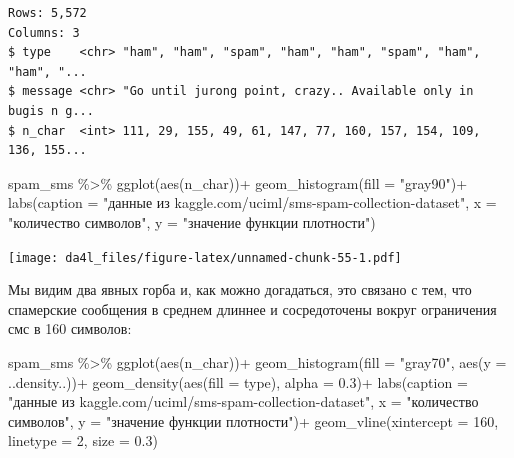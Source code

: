 \documentclass[
]{book}
\newenvironment{Shaded}{\begin{snugshade}}{\end{snugshade}}
\newcommand{\AttributeTok}[1]{\textcolor[rgb]{0.77,0.63,0.00}{#1}}
\newcommand{\DecValTok}[1]{\textcolor[rgb]{0.00,0.00,0.81}{#1}}
\newcommand{\FloatTok}[1]{\textcolor[rgb]{0.00,0.00,0.81}{#1}}
\newcommand{\FunctionTok}[1]{\textcolor[rgb]{0.00,0.00,0.00}{#1}}
\newcommand{\NormalTok}[1]{#1}
\newcommand{\SpecialCharTok}[1]{\textcolor[rgb]{0.00,0.00,0.00}{#1}}
\newcommand{\StringTok}[1]{\textcolor[rgb]{0.31,0.60,0.02}{#1}}
\begin{document}
\begin{verbatim}
Rows: 5,572
Columns: 3
$ type    <chr> "ham", "ham", "spam", "ham", "ham", "spam", "ham", "ham", "...
$ message <chr> "Go until jurong point, crazy.. Available only in bugis n g...
$ n_char  <int> 111, 29, 155, 49, 61, 147, 77, 160, 157, 154, 109, 136, 155...
\end{verbatim}

\begin{Shaded}
\begin{Highlighting}[]
\NormalTok{spam\_sms }\SpecialCharTok{\%\textgreater{}\%} 
  \FunctionTok{ggplot}\NormalTok{(}\FunctionTok{aes}\NormalTok{(n\_char))}\SpecialCharTok{+}
  \FunctionTok{geom\_histogram}\NormalTok{(}\AttributeTok{fill =} \StringTok{"gray90"}\NormalTok{)}\SpecialCharTok{+}
  \FunctionTok{labs}\NormalTok{(}\AttributeTok{caption =} \StringTok{"данные из kaggle.com/uciml/sms{-}spam{-}collection{-}dataset"}\NormalTok{,}
       \AttributeTok{x =} \StringTok{"количество символов"}\NormalTok{,}
       \AttributeTok{y =} \StringTok{"значение функции плотности"}\NormalTok{)}
\end{Highlighting}
\end{Shaded}

\texttt{[image: da4l\_files/figure-latex/unnamed-chunk-55-1.pdf]}

Мы видим два явных горба и, как можно догадаться, это связано с тем, что спамерские сообщения в среднем длиннее и сосредоточены вокруг ограничения смс в 160 символов:

\begin{Shaded}
\begin{Highlighting}[]
\NormalTok{spam\_sms }\SpecialCharTok{\%\textgreater{}\%} 
  \FunctionTok{ggplot}\NormalTok{(}\FunctionTok{aes}\NormalTok{(n\_char))}\SpecialCharTok{+}
  \FunctionTok{geom\_histogram}\NormalTok{(}\AttributeTok{fill =} \StringTok{"gray70"}\NormalTok{, }\FunctionTok{aes}\NormalTok{(}\AttributeTok{y =}\NormalTok{ ..density..))}\SpecialCharTok{+}
  \FunctionTok{geom\_density}\NormalTok{(}\FunctionTok{aes}\NormalTok{(}\AttributeTok{fill =}\NormalTok{ type), }\AttributeTok{alpha =} \FloatTok{0.3}\NormalTok{)}\SpecialCharTok{+}
  \FunctionTok{labs}\NormalTok{(}\AttributeTok{caption =} \StringTok{"данные из kaggle.com/uciml/sms{-}spam{-}collection{-}dataset"}\NormalTok{,}
       \AttributeTok{x =} \StringTok{"количество символов"}\NormalTok{,}
       \AttributeTok{y =} \StringTok{"значение функции плотности"}\NormalTok{)}\SpecialCharTok{+}
  \FunctionTok{geom\_vline}\NormalTok{(}\AttributeTok{xintercept =} \DecValTok{160}\NormalTok{, }\AttributeTok{linetype =} \DecValTok{2}\NormalTok{, }\AttributeTok{size =} \FloatTok{0.3}\NormalTok{)}
\end{Highlighting}
\end{Shaded}
\end{document}

